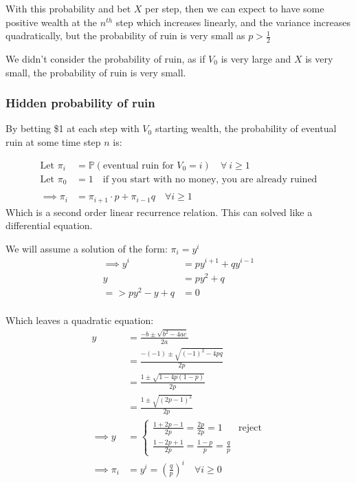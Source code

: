 \documentclass[
  oneside]{book}
\begin{document}
With this probability and bet \(X\) per step, then we can expect to have some positive wealth at the \(n^{th}\) step which increases linearly, and the variance increases quadratically, but the probability of ruin is very small as \(p>\frac{1}{2}\)

We didn't consider the probability of ruin, as if \(V_{0}\) is very large and \(X\) is very small, the probability of ruin is very small.

\hypertarget{hidden-probability-of-ruin}{%
\subsubsection{Hidden probability of ruin}\label{hidden-probability-of-ruin}}

By betting \$1 at each step with \(V_{0}\) starting wealth, the probability of eventual ruin at some time step \(n\) is:

\[
\begin{aligned}
\text{Let } \pi_{i} &= \mathbb{P}(\text{eventual ruin for }V_{0}=i) \quad \forall\ i\geq 1 \\
\text{Let } \pi_{0} &= 1 \quad \text{if you start with no money, you are already ruined}\\ \\
\implies \pi_{i} &= \pi_{i+1}\cdot p + \pi_{i-1}q \quad \forall i \geq 1
\end{aligned}
\]
Which is a second order linear recurrence relation. This can solved like a differential equation.

We will assume a solution of the form: \(\pi_{i} = y^{i}\)
\[
\begin{aligned}
\implies y^{i} &= py^{i+1}+qy^{i-1}\\
y &= py^{2}+q\\
=> py^{2}-y+q &= 0\\
\end{aligned}
\]

Which leaves a quadratic equation:
\[
\begin{aligned}
y &= \frac{-b\pm \sqrt{ b^{2} -4ac}}{2a}\\
&= \frac{-(-1)\pm \sqrt{ (-1)^{2}-4pq }}{2p}\\
&= \frac{1 \pm \sqrt{ 1-4p(1-p) }}{2p}\\
&= \frac{1\pm \sqrt{ (2p-1)^{2} }}{2p}\\
\implies y &= \begin{cases}
\frac{1+2p-1}{2p} = \frac{2p}{2p}=1  & \text{reject} \\
\frac{1-2p+1}{2p} = \frac{1-p}{p} = \frac{q}{p}
\end{cases}\\
\implies \pi_{i} &= y^{i} = \left( \frac{q}{p} \right)^{i} \quad \forall i \geq 0
\end{aligned}
\]
\end{document}
